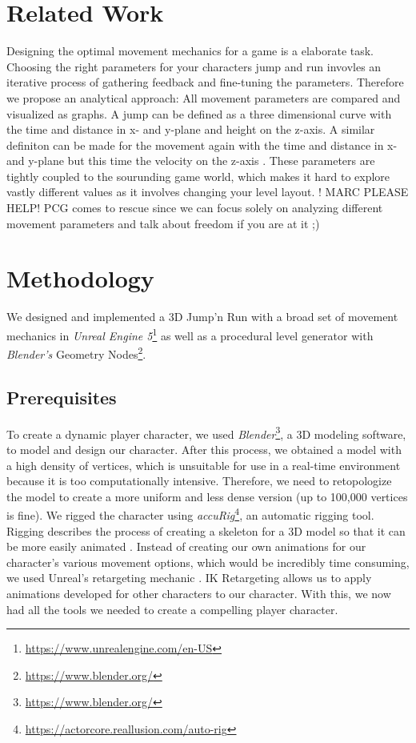 \documentclass[conference]{IEEEtran}
\begin{document}
\section{Related Work}
\label{Sec:RelatedWork}

Designing the optimal movement mechanics for a game is a elaborate task. 
Choosing the right parameters for your characters jump and run invovles an iterative process of gathering feedback and fine-tuning the parameters.
Therefore we propose an analytical approach:
All movement parameters are compared and visualized as graphs.
A jump can be defined as a three dimensional curve with the time and distance in x- and y-plane and height on the z-axis.
A similar definiton can be made for the movement again with the time and distance in x- and y-plane but this time the velocity on the z-axis \cite{gameMakerTool}.
These parameters are tightly coupled to the sourunding game world, which makes it hard to explore vastly different values as it involves changing your level layout.
! MARC PLEASE HELP! 
PCG comes to rescue since we can focus solely on analyzing different movement parameters and talk about freedom if you are at it ;)

\section{Methodology}
\label{Sec:Methodology}

We designed and implemented a 3D Jump'n Run with a broad set of movement mechanics in \textit{Unreal Engine 5}\footnote{\url{https://www.unrealengine.com/en-US}} 
as well as a procedural level generator with \textit{Blender's} Geometry Nodes\footnote{\url{https://www.blender.org/}}.

\subsection{Prerequisites}

To create a dynamic player character, we used \textit{Blender}\footnote{\url{https://www.blender.org/}}, a 3D modeling software, to model and design our character.
After this process, we obtained a model with a high density of vertices, which is unsuitable for use in a real-time environment because it is too computationally intensive.
Therefore, we need to retopologize the model to create a more uniform and less dense version (up to 100,000 vertices is fine).
We rigged the character using \textit{accuRig}\footnote{\url{https://actorcore.reallusion.com/auto-rig}}, an automatic rigging tool.
Rigging describes the process of creating a skeleton for a 3D model so that it can be more easily animated \cite{rigging}.
Instead of creating our own animations for our character's various movement options, which would be incredibly time consuming, we used Unreal's retargeting mechanic \cite{retarget}.
IK Retargeting allows us to apply animations developed for other characters to our character.
With this, we now had all the tools we needed to create a compelling player character.
\end{document}
